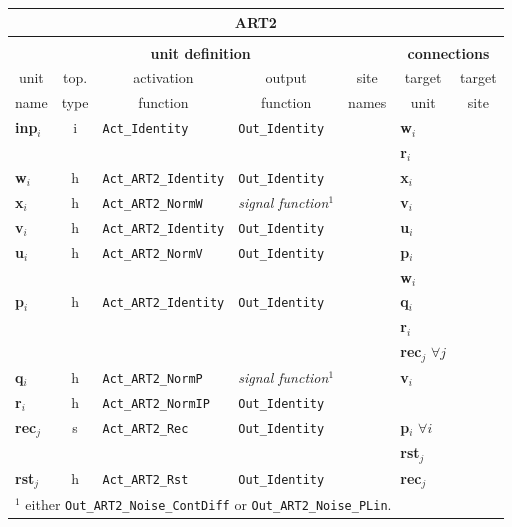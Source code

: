 {\newpage
\clearpage
\samepage \begin{tabular}{|l|c|l|l|l||l|l|} \hline
\multicolumn{7}{|c|}{{\bf ART2}} \\  \hline
\multicolumn{7}{l}{\vspace{5mm}} \\  \hline
%
\multicolumn{5}{|c||}{{\bf unit definition}}
           & \multicolumn{2}{c|}{{\bf connections}} \\  \hline
%
\multicolumn{1}{|c}{unit} & \multicolumn{1}{|c}{top.} &
\multicolumn{1}{|c}{activation} & \multicolumn{1}{|c}{output} &
\multicolumn{1}{|c||}{site} & \multicolumn{1}{c}{target} &
\multicolumn{1}{|c|}{target} \\ 
%
\multicolumn{1}{|c}{name} & \multicolumn{1}{|c}{type} &
\multicolumn{1}{|c|}{function} & \multicolumn{1}{|c}{function}
& \multicolumn{1}{|c||}{names} & \multicolumn{1}{c}{unit} &
\multicolumn{1}{|c|}{site} \\ 
\hline
%
{\bf inp}$_{i}$ & i & {\tt Act\_Identity}  & {\tt Out\_Identity}  & & {\bf w}$_{i}$ & \\ 
& & & & & {\bf r}$_{i}$ & \\  \hline
{\bf w}$_{i}$ & h & {\tt Act\_ART2\_Identity}  & {\tt Out\_Identity}  & & {\bf x}$_{i}$ & \\  \hline
{\bf x}$_{i}$ & h & {\tt Act\_ART2\_NormW} & {\em signal function}$^1$ & & {\bf v}$_{i}$ & \\ 
\hline
{\bf v}$_{i}$ & h & {\tt Act\_ART2\_Identity}  & {\tt Out\_Identity}  & & {\bf u}$_{i}$ & \\  \hline
{\bf u}$_{i}$ & h & {\tt Act\_ART2\_NormV} & {\tt Out\_Identity}  & & {\bf p}$_{i}$ & \\ 
& & & & & {\bf w}$_{i}$ & \\  \hline
{\bf p}$_{i}$ & h & {\tt Act\_ART2\_Identity}  & {\tt Out\_Identity}  & & {\bf q}$_{i}$ & \\ 
& & & & & {\bf r}$_{i}$ & \\ 
& & & & & {\bf rec}$_{j}$ $\forall j$ & \\  \hline
{\bf q}$_{i}$ & h & {\tt Act\_ART2\_NormP} & {\em signal function}$^1$ & & {\bf v}$_{i}$ & \\ 
\hline
{\bf r}$_{i}$ & h & {\tt Act\_ART2\_NormIP} & {\tt Out\_Identity}  & & & \\  \hline
{\bf rec}$_{j}$ & s & {\tt Act\_ART2\_Rec} & {\tt Out\_Identity}  & & {\bf p}$_{i}$ $\forall i$ & \\ 
& & & & & {\bf rst}$_{j}$ & \\  \hline
{\bf rst}$_{j}$ & h & {\tt Act\_ART2\_Rst} & {\tt Out\_Identity}  & & {\bf rec}$_{j}$ & \\ 
\hline
\multicolumn{7}{|l|}{$^1$ either {\tt Out\_ART2\_Noise\_ContDiff}
                     or {\tt Out\_ART2\_Noise\_PLin}.} \\ 
\hline
\end{tabular}
}

